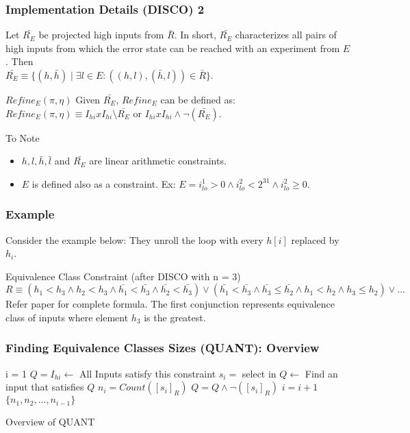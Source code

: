 \documentclass{beamer}
\begin{document}
\begin{frame}
\frametitle{Implementation Details (DISCO) 2}
Let $\bar{R_{E}}$ be projected high inputs from $\bar{R}$. In short, $\bar{R_{E}}$ characterizes all pairs of high inputs from which the error state can be reached with an experiment from $E$. Then \\
$\bar{R_{E}} \equiv \{(h, \bar{h}) \mid \exists l \in E : ((h,l), (\bar{h}, l)) \in \bar{R}\}$. 
\begin{block}{$Refine_{E}(\pi,\eta)$}
Given $\bar{R_{E}}$, $Refine_{E}$ can be defined as:\\
$Refine_{E}(\pi, \eta) \equiv I_{hi} x I_{hi} \setminus \bar{R_{E}}$ or $I_{hi} x I_{hi} \land \neg (\bar{R_{E}})$.
\end{block}
\begin{block}{To Note}
\begin{itemize}
\item $h, l, \bar{h}, \bar{l}$ and $\bar{R_{E}}$ are linear arithmetic constraints.
\item $E$ is defined also as a constraint. Ex: $E = i_{lo}^{1} > 0 \land i_{lo}^{2} < 2^{31} \land i_{lo}^{2} \geq 0 $.
\end{itemize}
\end{block}
\end{frame}

\begin{frame}
\frametitle{Example}
Consider the example below:
\lst
They unroll the loop with every $h[i]$ replaced by $h_{i}$.
\begin{block}{Equivalence Class Constraint (after DISCO with n = 3)}
$ R \equiv (h_{1} < h_{3} \land h_{2} < h_{3} \land \bar{h_{1}} < \bar{h_{3}} \land \bar{h_{2}} < \bar{h_{3}}) \lor (\bar{h_{1}} < \bar{h_{3}} \land \bar{h_{3}} \leq \bar{h_{2}} \land h_{1} < h_{2} \land h_{3} \leq h_{2}) \lor ...$
Refer paper for complete formula. The first conjunction represents equivalence class of inputs where element $h_{3}$ is the greatest.
\end{block}
\end{frame}

\begin{frame}
\frametitle{Finding Equivalence Classes Sizes (QUANT): Overview}
\begin{algorithm}[H]
\begin{algorithmic}[1]
\STATE i = 1
\STATE $Q = I_{hi} \leftarrow$ All Inputs satisfy this constraint
\STATE $s_{i} =$ select in $Q \leftarrow$ Find an input that satisfies $Q$
\STATE $n_{i} = Count([s_{i}]_{R})$
\STATE $Q = Q \land \neg ([s_{i}]_{R})$
\STATE $i = i + 1$
\ENDWHILE
\RETURN $\{n_{1},n_{2},...,n_{i-1}\}$
\end{algorithmic}
\caption{Overview of QUANT}
\label{alg:quant}
\end{algorithm}
\end{frame}
\end{document}
